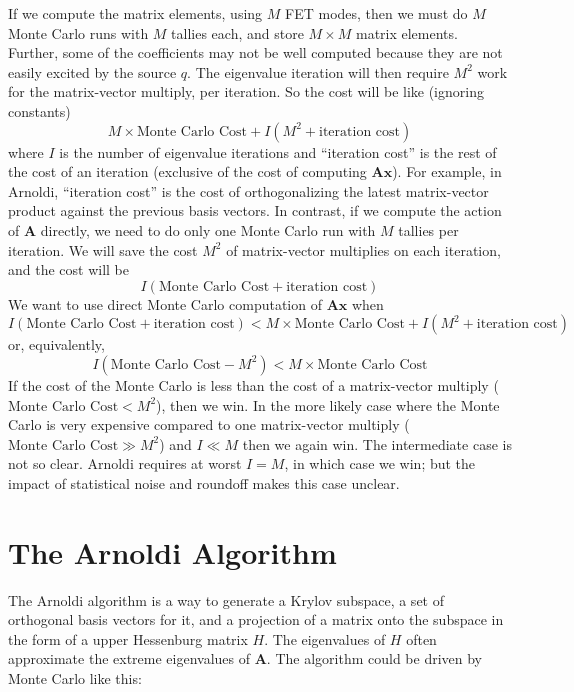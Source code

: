 \documentclass[11pt,onecolumn]{article}
\newcommand{\FM}{\mathbf{A}}
\newcommand{\x}{\mathbf{x}}
\begin{document}
If we compute the matrix elements, using $M$ FET modes, then we must do $M$ Monte Carlo runs with $M$ tallies each, and store $M \times M$ matrix elements.  Further, some of the coefficients may not be well computed because they are not easily excited by the source $q$.  The eigenvalue iteration will then require $M^2$ work for the matrix-vector multiply, per iteration.  So the cost will be like (ignoring constants)
\begin{equation}
M \times \text{Monte Carlo Cost} + I (M^2 + \text{iteration cost})
\end{equation}
where $I$ is the number of eigenvalue iterations and ``iteration cost'' is the rest of the cost of an iteration (exclusive of the cost of computing $\FM \x$).
For example, in Arnoldi, ``iteration cost'' is the cost of orthogonalizing the latest matrix-vector product against the previous basis vectors.
In contrast,
if we compute the action of $\FM$ directly, we need to do only one Monte Carlo run with $M$ tallies per iteration.   We will save the cost $M^2$ of matrix-vector multiplies on each iteration, and the cost will be
\begin{equation}
I (\text{Monte Carlo Cost} + \text{iteration cost})
\end{equation}
We want to use direct Monte Carlo computation of $\FM \x$ when
\begin{equation}
I (\text{Monte Carlo Cost} + \text{iteration cost})
< M \times \text{Monte Carlo Cost} + I (M^2 + \text{iteration cost})
\end{equation}
or, equivalently,
\begin{equation}
I (\text{Monte Carlo Cost} - M^2)
< M \times \text{Monte Carlo Cost}
\end{equation}
If the cost of the Monte Carlo is less than the cost of a matrix-vector multiply ($\text{Monte Carlo Cost} < M^2$), then we win.  In the more likely case where the Monte Carlo is very expensive compared to one matrix-vector multiply ($\text{Monte Carlo Cost} \gg M^2$) and $I \ll M$ then we again win.  The intermediate case is not so clear.  Arnoldi requires at worst $I = M$, in which case we win; but the impact of statistical noise and roundoff makes this case unclear.

\section{The Arnoldi Algorithm}

The Arnoldi algorithm is a way to generate a Krylov subspace, a set of orthogonal basis vectors for it, and a projection of a matrix onto the subspace in the form of a upper Hessenburg matrix $H$.   The eigenvalues of $H$ often approximate the extreme eigenvalues of $\FM$.  The algorithm could be driven by Monte Carlo like this:
\end{document}
